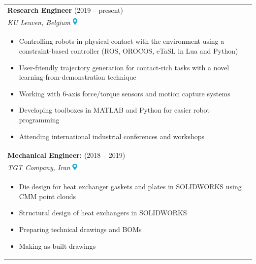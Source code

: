 \documentclass[lighthipster]{simplehipstercv}
\begin{document}
\begin{paracol}{2}
		\begin{table}[h]
			\centering
			\begin{tabularx}{\linewidth}{X} %
				\textbf{Research Engineer} (2019 -- present) \\
				\textit{KU Leuven, Belgium} \includegraphics[height=0.35cm]{files/location.pdf} \\
				\vspace{-0.3cm}
				\begin{itemize}[leftmargin=1em, itemsep=0pt, topsep=0pt]
					\item Controlling robots in physical contact with the environment using a constraint-based controller (ROS, OROCOS, eTaSL in Lua and Python)
					\item User-friendly trajectory generation for contact-rich tasks with a novel learning-from-demonstration technique
					\item Working with 6-axis force/torque sensors and motion capture systems
					\item Developing toolboxes in MATLAB and Python for easier robot programming
					\item Attending international industrial conferences and workshops
				\end{itemize} \\
				
				\vspace{0.01cm}
				\textbf{Mechanical Engineer:} (2018 -- 2019) \\
				\textit{TGT Company, Iran} \includegraphics[height=0.35cm]{files/location.pdf} \\
				\vspace{-0.3cm}
				\begin{itemize}[leftmargin=1em, itemsep=0pt, topsep=0pt]
					\item Die design for heat exchanger gaskets and plates in SOLIDWORKS using CMM point clouds
					\item Structural design of heat exchangers in SOLIDWORKS
					\item Preparing technical drawings and BOMs
					\item Making as-built drawings
				\end{itemize} \\
			

\end{tabularx}
\end{table}
\end{paracol}
\end{document}
